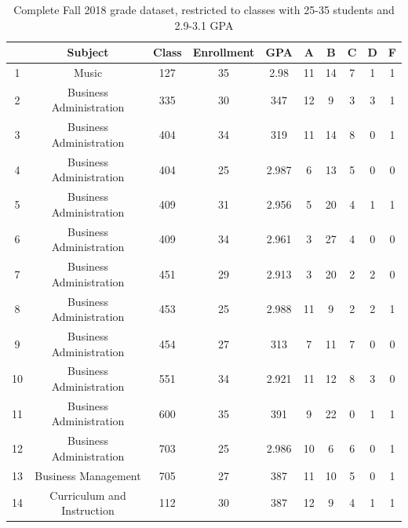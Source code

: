 \documentclass[12pt,letterpaper,oneside,openany]{book}
\begin{document}
\begin{center}
	
	\begin{longtable}{c||ccccccccc}
		\caption{Complete Fall 2018 grade dataset, restricted to classes with 25-35 students and 2.9-3.1 GPA} \\
		\label{tab:fullfall2018} 
		& Subject               & Class & Enrollment & GPA   & A    & B    & C   & D   & F   \\ \hline
		\endfirsthead
		\endhead
		1  & Music                           & 127   & 35                & 2.98  & 11 & 14 & 7 & 1 & 1 \\
2  & Business Administration         & 335   & 30                & 347 & 12 & 9  & 3 & 3 & 1 \\
3  & Business Administration         & 404   & 34                & 319 & 11 & 14 & 8 & 0 & 1 \\
4  & Business Administration         & 404   & 25                & 2.987 & 6  & 13 & 5 & 0 & 0 \\
5  & Business Administration         & 409   & 31                & 2.956 & 5  & 20 & 4 & 1 & 1 \\
6  & Business Administration         & 409   & 34                & 2.961 & 3  & 27 & 4 & 0 & 0 \\
7  & Business Administration         & 451   & 29                & 2.913 & 3  & 20 & 2 & 2 & 0 \\
8  & Business Administration         & 453   & 25                & 2.988 & 11 & 9  & 2 & 2 & 1 \\
9  & Business Administration         & 454   & 27                & 313 & 7  & 11 & 7 & 0 & 0 \\
10  & Business Administration         & 551   & 34                & 2.921 & 11 & 12 & 8 & 3 & 0 \\
11 & Business Administration         & 600   & 35                & 391 & 9  & 22 & 0 & 1 & 1 \\
12 & Business Administration         & 703   & 25                & 2.986 & 10 & 6  & 6 & 0 & 1 \\
13 & Business Management             & 705   & 27                & 387 & 11 & 10 & 5 & 0 & 1 \\
14 & Curriculum and Instruction      & 112   & 30                & 387 & 12 & 9  & 4 & 1 & 1 \\

\end{longtable}
\end{center}
\end{document}
